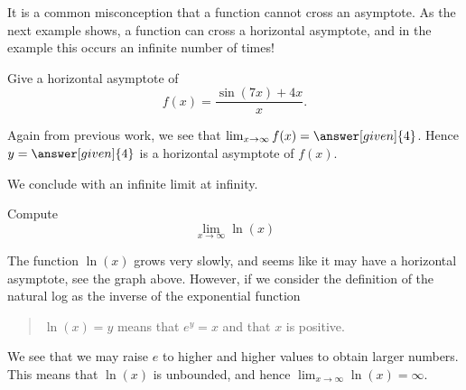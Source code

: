 \documentclass{ximera}
\begin{document}
It is a common misconception that a function cannot cross an
asymptote. As the next example shows, a function can cross a horizontal
asymptote, and in the example this occurs an infinite number of times!

\begin{example}
Give a horizontal asymptote of
\[
f(x) = \frac{\sin(7x)+4x}{x}.
\]
\begin{explanation}
Again from previous work, we see that $\lim_{x\to \infty} f(x) =
\answer[given]{4}$. Hence $y=\answer[given]{4}$ is a horizontal asymptote of $f(x)$.
\end{explanation}
\end{example}


We conclude with an infinite limit at infinity.

\begin{example}
Compute
\[
\lim_{x\to \infty} \ln(x)
\]
\begin{image}
\end{image}
\begin{explanation}
The function $\ln(x)$ grows very slowly, and seems like it may have a
horizontal asymptote, see the graph above. However, if we consider the
definition of the natural log as the inverse of the exponential
function
\begin{quote}%
  $\ln(x) = y$ means that $e^y =x$ and that $x$ is positive.
\end{quote}
We see that we may raise $e$ to higher and higher values to obtain
larger numbers.  This means that $\ln(x)$ is unbounded, and hence
$\lim_{x\to\infty}\ln(x)=\infty$.
\end{explanation}
\end{example}
\end{document}
